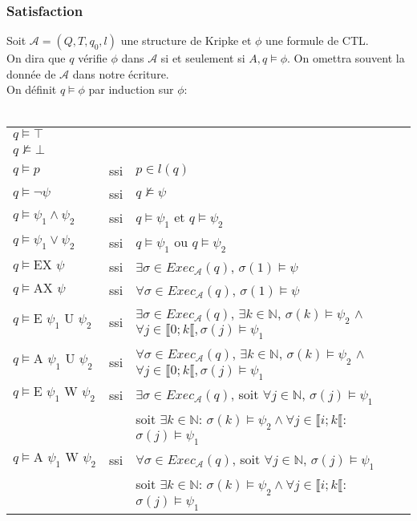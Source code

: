 \documentclass[10pt,a4paper]{article}
\begin{document}
\subsubsection{Satisfaction}
\label{satisf}
Soit $\mathcal{A} = (Q,T,q_0,l)$ une structure de Kripke et $\phi$ une formule de CTL.\\
On dira que $q$ vérifie $\phi$ dans $\mathcal{A}$ si et seulement si $A, q \vDash \phi$. On omettra souvent la donnée de $\mathcal{A}$ dans notre écriture.\\
On définit $q \vDash \phi$ par induction sur $\phi$:\\
\\
\begin{tabular}{lcl}
$q \vDash \top$ &&\\
$q \nvDash \bot$ &&\\
$q \vDash p$ &ssi& $p \in l (q)$\\
$q \vDash \neg \psi$ &ssi& $q \nvDash \psi$\\
$q \vDash \psi_1 \land \psi_2$ &ssi& $q \vDash \psi_1$ et $q \vDash \psi_2$\\
$q \vDash \psi_1 \lor \psi_2$ &ssi& $q \vDash \psi_1$ ou $q \vDash \psi_2$\\
$q \vDash \mbox{EX } \psi$ &ssi& $\exists \sigma \in Exec_\mathcal{A}(q)$, $\sigma(1) \vDash \psi$\\
$q \vDash \mbox{AX } \psi$ &ssi& $\forall \sigma \in Exec_\mathcal{A}(q)$, $\sigma(1) \vDash \psi$\\

$q \vDash \mbox{E } \psi_1 \mbox{ U } \psi_2$ &ssi& $\exists \sigma \in Exec_\mathcal{A}(q)$, $\exists k \in \mathbb{N}$, $\sigma(k)\vDash \psi_2$ $\land$ $\forall j \in \llbracket 0; k\llbracket, \sigma(j)\vDash \psi_1$\\

$q \vDash \mbox{A } \psi_1 \mbox{ U } \psi_2$ &ssi& $\forall \sigma \in Exec_\mathcal{A}(q)$, $\exists k \in \mathbb{N}$, $\sigma(k)\vDash \psi_2$ $\land$ $\forall j \in \llbracket 0; k\llbracket, \sigma(j)\vDash \psi_1$\\

$q \vDash \mbox{E } \psi_1 \mbox{ W } \psi_2$ &ssi& $\exists \sigma \in Exec_\mathcal{A}(q)$, soit $\forall j \in \mathbb{N}$, $\sigma(j) \vDash \psi_1$\\
& & soit $\exists k\in \mathbb{N}$: $\sigma(k)\vDash \psi_2 \land \forall j \in \llbracket i; k \llbracket$: $\sigma(j) \vDash \psi_1$\\

$q \vDash \mbox{A } \psi_1 \mbox{ W } \psi_2$ &ssi& $\forall \sigma \in Exec_\mathcal{A}(q)$, soit $\forall j \in \mathbb{N}$, $\sigma(j) \vDash \psi_1$\\
& & soit $\exists k\in \mathbb{N}$: $\sigma(k)\vDash \psi_2 \land \forall j \in \llbracket i; k \llbracket$: $\sigma(j) \vDash \psi_1$\\
\end{tabular}
\end{document}
